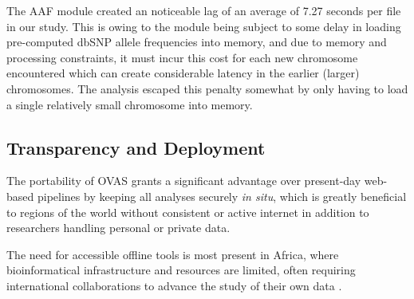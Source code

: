 \documentclass[twocolumn]{bmcart}%
\def\app{OVAS}
\newcommand{\changes}[1]{{\color{red} #1}}
\begin{document}
The AAF module created an noticeable lag of an average of 7.27 seconds per file in our study. This is owing to the module being subject to some delay in loading pre-computed dbSNP allele frequencies into memory, and due to memory and processing constraints, it must incur this cost for each new chromosome encountered which can create considerable latency in the earlier (larger) chromosomes. The analysis escaped this penalty somewhat by only having to load a single relatively small chromosome into memory.



\subsection{Transparency and Deployment}

The portability of \app{} grants a significant advantage over present-day web-based pipelines by keeping all analyses securely \textit{in situ}, which is greatly beneficial to regions of the world without consistent or active internet in addition to researchers handling personal or private data. 

\changes{The need for accessible offline tools is most present in Africa, where bioinformatical infrastructure and resources are limited, often requiring international collaborations to advance the study of their own data \cite{h3africa2014enabling}.}
\end{document}
